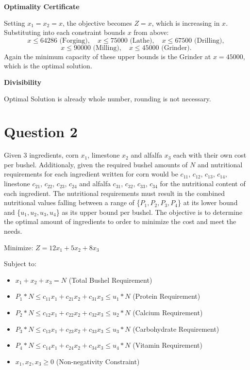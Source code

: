\documentclass{article}
\begin{document}
    \textbf{Optimality Certificate}

    Setting $x_1 = x_2 = x$, the objective becomes $Z = x$, which is increasing in $x$. Substituting into each constraint bounds $x$ from above:
    \[
    x \le 64286 \text{ (Forging)}, \quad x \le 75000 \text{ (Lathe)}, \quad x \le 67500 \text{ (Drilling)},
    \]
    \[
    x \le 90000 \text{ (Milling)}, \quad x \le 45000 \text{ (Grinder)}.
    \]
    Again the minimum capacity of these upper bounds is the Grinder at $x = 45000$, which is the optimal solution.

    \textbf{Divisibility}

    Optimal Solution is already whole number, rounding is not necessary.

\section*{Question 2}
Given 3 ingredients, corn $x_1$, limestone $x_2$ and alfalfa $x_3$ each with their own cost per bushel. Additionaly, given the required bushel amounts of $N$ and nutritional requirements for each ingredient written for corn would be $c_{11}$, $c_{12}$, $c_{13}$, $c_{14}$, linestone $c_{21}$, $c_{22}$, $c_{23}$, $c_{24}$ and alfalfa $c_{31}$, $c_{32}$, $c_{33}$, $c_{34}$ for the nutritional content of each ingredient. The nutritional requirements must result in the combined nutritional values falling between a range of \{$P_1, P_2, P_3, P_4$\} at its lower bound and \{$u_1, u_2, u_3, u_4$\} as its upper bound per bushel.
The objective is to determine the optimal amount of ingredients to order to minimize the cost and meet the needs.

Minimize: $Z = 12x_1 + 5x_2 + 8x_3$

Subject to:
\begin{itemize}
    \item $x_1+x_2+x_3 = N$ (Total Bushel Requirement)
    \item $P_1*N \le c_{11}x_1 + c_{21}x_2 + c_{31}x_3 \le u_1*N$ (Protein Requirement)
    \item $P_2*N \le c_{12}x_1 + c_{22}x_2 + c_{32}x_3 \le u_2*N$ (Calcium Requirement)
    \item $P_3*N \le c_{13}x_1 + c_{23}x_2 + c_{33}x_3 \le u_3*N$ (Carbohydrate Requirement)
    \item $P_4*N \le c_{14}x_1 + c_{24}x_2 + c_{34}x_3 \le u_4*N$ (Vitamin Requirement)
    \item $x_1, x_2, x_3 \ge 0$ (Non-negativity Constraint)
\end{itemize}
\end{document}

